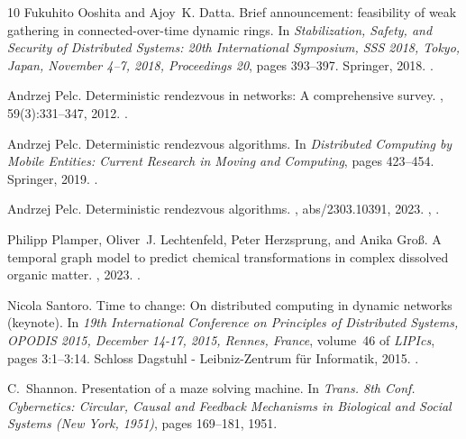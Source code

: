 \documentclass[10pt,a4paper]{article}
\begin{document}
\begin{thebibliography}{10}
Fukuhito Ooshita and Ajoy~K. Datta.
\newblock Brief announcement: feasibility of weak gathering in
  connected-over-time dynamic rings.
\newblock In {\em Stabilization, Safety, and Security of Distributed Systems:
  20th International Symposium, SSS 2018, Tokyo, Japan, November 4--7, 2018,
  Proceedings 20}, pages 393--397. Springer, 2018.
\newblock \href {https://doi.org/10.1007/978-3-030-03232-6_27}
  {}.

Andrzej Pelc.
\newblock Deterministic rendezvous in networks: A comprehensive survey.
, 59(3):331--347, 2012.
\newblock \href {https://doi.org/10.1002/net.21453}
  {}.

Andrzej Pelc.
\newblock Deterministic rendezvous algorithms.
\newblock In {\em Distributed Computing by Mobile Entities: Current Research in
  Moving and Computing}, pages 423--454. Springer, 2019.
\newblock \href {https://doi.org/10.1007/978-3-030-11072-7\_17}
  {}.

Andrzej Pelc.
\newblock Deterministic rendezvous algorithms.
, abs/2303.10391, 2023.
\newblock \href {http://arxiv.org/abs/2303.10391} {},
  \href {https://doi.org/10.48550/arXiv.2303.10391}
  {}.

Philipp Plamper, Oliver~J. Lechtenfeld, Peter Herzsprung, and Anika Groß.
\newblock A temporal graph model to predict chemical transformations in complex
  dissolved organic matter.
, 2023.
\newblock \href {https://doi.org/10.1021/acs.est.3c00351}
  {}.

Nicola Santoro.
\newblock Time to change: On distributed computing in dynamic networks
  (keynote).
\newblock In {\em 19th International Conference on Principles of Distributed
  Systems, {OPODIS} 2015, December 14-17, 2015, Rennes, France}, volume~46 of
  {\em LIPIcs}, pages 3:1--3:14. Schloss Dagstuhl - Leibniz-Zentrum f{\"{u}}r
  Informatik, 2015.
\newblock \href {https://doi.org/10.4230/LIPIcs.OPODIS.2015.3}
  {}.

C.~Shannon.
\newblock Presentation of a maze solving machine.
\newblock In {\em Trans. 8th Conf. Cybernetics: Circular, Causal and Feedback
  Mechanisms in Biological and Social Systems (New York, 1951)}, pages
  169--181, 1951.


\end{thebibliography}
\end{document}
